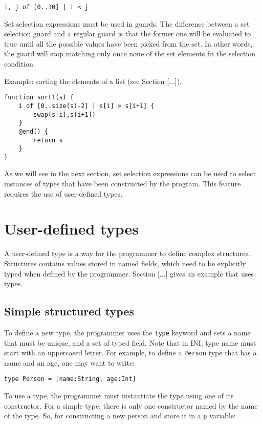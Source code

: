 \documentclass[11pt]{report}
\begin{document}
\begin{lstlisting}[numbers=none]
i, j of [0..10] | i < j
\end{lstlisting}

Set selection expressions must be used in guards. The difference between a set selection guard and a regular guard is that the former one will be evaluated to true until all the possible values have been picked from the set. In other words, the guard will stop matching only once none of the set elements fit the selection condition.

Example: sorting the elements of a list (see Section [...]).

\begin{lstlisting}
function sort1(s) {
	i of [0..size(s)-2] | s[i] > s[i+1] {
		swap(s[i],s[i+1])
	}
	@end() {
		return s
	}
}
\end{lstlisting}

As we will see in the next section, set selection expressions can be used to select instances of types that have been constructed by the program. This feature requires the use of user-defined types.

\section{User-defined types}

A user-defined type is a way for the programmer to define complex structures. Structures contains values stored in named fields, which need to be explicitly typed when defined by the programmer. Section [...] gives an example that uses types.

\subsection{Simple structured types}

To define a new type, the programmer uses the \texttt{type} keyword and sets a name that must be unique, and a set of typed field. Note that in INI, type name must start with an uppercased letter. For example, to define a \texttt{Person} type that has a name and an age, one may want to write:

\begin{lstlisting}[numbers=none]
type Person = [name:String, age:Int]
\end{lstlisting}

To use a type, the programmer must instantiate the type using one of its constructor. For a simple type, there is only one constructor named by the name of the type. So, for constructing a new person and store it in a \texttt{p} variable:
\end{document}
